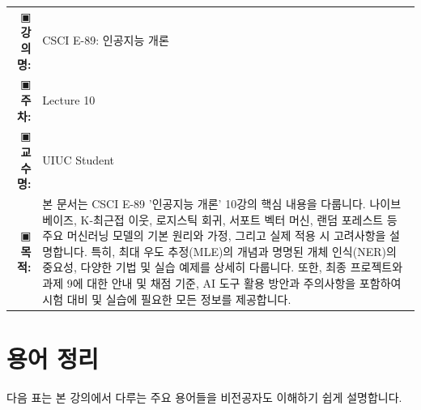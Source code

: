 \documentclass[11pt,a4paper]{article}
\makeatletter
\theoremstyle{definition}
\newcommand{\metainfo}[4]{
\begin{tcolorbox}[
    colback=lightpurple,
    colframe=darkpurple,
    boxrule=1pt,
    arc=2mm,
    left=10pt,
    right=10pt,
    top=8pt,
    bottom=8pt
]
\begin{tabular}{@{}rl@{}}
▣ \textbf{강의명:} & #1 \\[0.3em]
▣ \textbf{주차:} & #2 \\[0.3em]
▣ \textbf{교수명:} & #3 \\[0.3em]
▣ \textbf{목적:} & \begin{minipage}[t]{0.75\textwidth}#4\end{minipage}
\end{tabular}
\end{tcolorbox}
}
\makeatother
\begin{document}
\thispagestyle{firstpage}

\metainfo{CSCI E-89: 인공지능 개론}{Lecture 10}{UIUC Student}{본 문서는 CSCI E-89 '인공지능 개론' 10강의 핵심 내용을 다룹니다. 나이브 베이즈, K-최근접 이웃, 로지스틱 회귀, 서포트 벡터 머신, 랜덤 포레스트 등 주요 머신러닝 모델의 기본 원리와 가정, 그리고 실제 적용 시 고려사항을 설명합니다. 특히, 최대 우도 추정(MLE)의 개념과 명명된 개체 인식(NER)의 중요성, 다양한 기법 및 실습 예제를 상세히 다룹니다. 또한, 최종 프로젝트와 과제 9에 대한 안내 및 채점 기준, AI 도구 활용 방안과 주의사항을 포함하여 시험 대비 및 실습에 필요한 모든 정보를 제공합니다.}

\tableofcontents

\newpage

\section{용어 정리}
다음 표는 본 강의에서 다루는 주요 용어들을 비전공자도 이해하기 쉽게 설명합니다.
\end{document}
